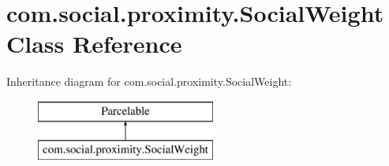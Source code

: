 \hypertarget{classcom_1_1social_1_1proximity_1_1_social_weight}{}\section{com.\+social.\+proximity.\+Social\+Weight Class Reference}
\label{classcom_1_1social_1_1proximity_1_1_social_weight}
Inheritance diagram for com.\+social.\+proximity.\+Social\+Weight\+:\begin{figure}[H]
\begin{center}
\leavevmode
\includegraphics[height=2.000000cm]{classcom_1_1social_1_1proximity_1_1_social_weight}
\end{center}
\end{figure}
